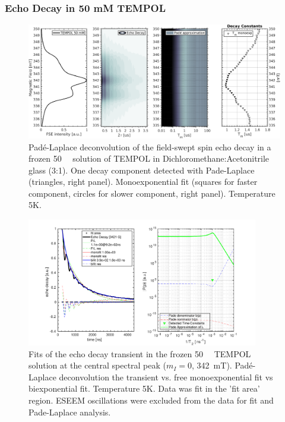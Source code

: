 \subsubsection{Echo Decay in 50 mM TEMPOL}
\begin{figure}[ht!]
\center
	\includegraphics[width=1\textwidth]{./pulse/figures/Figure_S8.png}
	\caption{Pad{\'e}-Laplace deconvolution of the field-swept spin echo decay in a frozen 50~\si{\milli\Molar}  solution of TEMPOL in Dichloromethane:Acetonitrile glass (3:1). One decay component detected with Pade-Laplace (triangles, right panel). Monoexponential fit (squares for faster component, circles for slower component, right panel). Temperature 5K.}
	\label{fig:Figure_S8}
\end{figure}

\begin{figure}[ht!]
\center
	\includegraphics[width=0.9\textwidth]{./pulse/figures/Figure_S9.pdf}
	\caption{Fits of the echo decay transient in the frozen 50~\si{\milli\Molar}  TEMPOL solution at the central spectral peak ($m_I=0$, 342~mT). Pad{\'e}-Laplace deconvolution the transient vs. free monoexponential fit vs biexponential fit. Temperature 5K. Data was fit in the 'fit area' region. ESEEM oscillations were excluded from the data for fit and Pade-Laplace analysis.}
	\label{fig:Figure_S9}
\end{figure}


